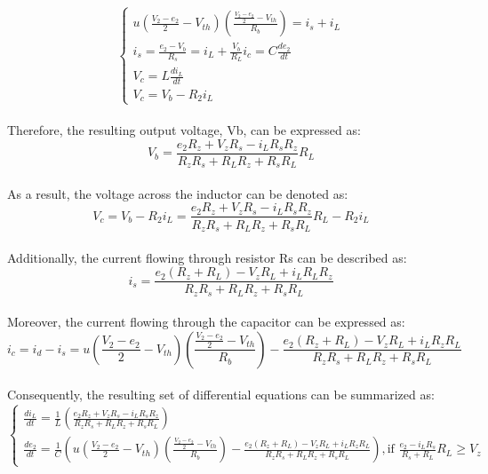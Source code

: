 \begin{equation}
    \begin{cases}
        u(\frac{V_2-e_2}{2}-V_{th})(\frac{\frac{V_2-e_2}{2}-V_{th}}{R_b})=i_s+i_L\\
        i_s=\frac{e_2-V_b}{R_s}=i_L+\frac{V_b}{R_L}
        i_c=C\frac{de_2}{dt}\\
        V_c=L\frac{di_L}{dt}\\
        V_c=V_b-R_2i_L
    \end{cases}
\end{equation}\\

Therefore, the resulting output voltage, Vb, can be expressed as:\\

\begin{equation}
    V_b=\frac{e_2R_z+V_zR_s-i_LR_sR_z}{R_zR_s+R_LR_z+R_sR_L}R_L
\end{equation}\\

As a result, the voltage across the inductor can be denoted as:\\

\begin{equation}
    V_c=V_b-R_2i_L=\frac{e_2R_z+V_zR_s-i_LR_sR_z}{R_zR_s+R_LR_z+R_sR_L}R_L-R_2i_L
\end{equation}\\

Additionally, the current flowing through resistor Rs can be described as:\\

\begin{equation}
    i_s=\frac{e_2(R_z+R_L)-V_zR_L+i_LR_LR_z}{R_zR_s+R_LR_z+R_sR_L}
\end{equation}\\

Moreover, the current flowing through the capacitor can be expressed as:\\

\begin{equation}
    i_c=i_d-i_s=u(\frac{V_2-e_2}{2}-V_{th})(\frac{\frac{V_2-e_2}{2}-V_{th}}{R_b})-\frac{e_2(R_z+R_L)-V_zR_L+i_LR_zR_L}{R_zR_s+R_LR_z+R_sR_L}
\end{equation}\\

Consequently, the resulting set of differential equations can be summarized as:\\

\begin{equation}
    \begin{cases}
        \frac{di_L}{dt}=\frac{1}{L}(\frac{e_2R_z+V_zR_s-i_LR_sR_z}{R_zR_s+R_LR_z+R_sR_L})\\
        \frac{de_2}{dt}=\frac{1}{C}(u(\frac{V_2-e_2}{2}-V_{th})(\frac{\frac{V_2-e_2}{2}-V_{th}}{R_b})-\frac{e_2(R_z+R_L)-V_zR_L+i_LR_zR_L}{R_zR_s+R_LR_z+R_sR_L}),  \text{if } \frac{e_2-i_LR_s}{R_s+R_L}R_L \geq V_z
    \end{cases}
\end{equation}\\
\fi


